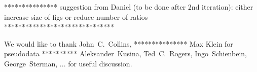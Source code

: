 \documentclass[pdftex,twocolumn,epjc3]{svjour3}          %
\begin{document}
*************** suggestion from Daniel (to be done after 2nd iteration):
either increase  size of figs or reduce  number of ratios
*******************************

\begin{acknowledgements}

We would like to thank
John~C.~Collins,
*************** Max Klein for pseudodata **********
Aleksander~Kusina,
Ted~C.~Rogers,
Ingo~Schienbein,
George~Sterman,
...
for useful discussion.

\end{acknowledgements}





\end{document}
